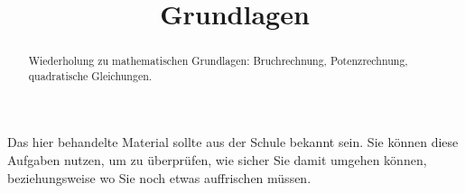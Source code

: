 \documentclass{ximera}
\title{Grundlagen}
\begin{document}
\begin{abstract}
Wiederholung zu mathematischen Grundlagen: Bruchrechnung, Potenzrechnung, quadratische Gleichungen.
\end{abstract}
\maketitle

Das hier behandelte Material sollte aus der Schule bekannt sein. Sie können diese Aufgaben nutzen, um zu überprüfen, wie sicher Sie damit umgehen können, beziehungsweise wo Sie noch etwas auffrischen müssen.
\end{document}
